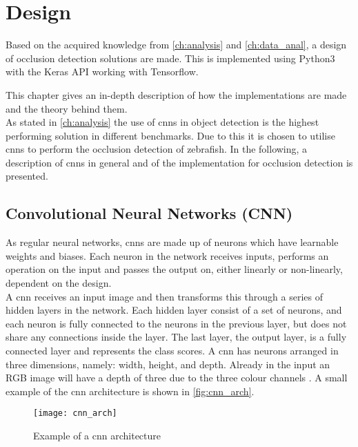\graphicspath{{figures/design/}}
\chapter{Design}\label{ch:design}
Based on the acquired knowledge from \autoref{ch:analysis} and \autoref{ch:data_anal}, a design of occlusion detection solutions are made. This is implemented using Python3 with the Keras API working with Tensorflow.

This chapter gives an in-depth description of how the implementations are made and the theory behind them.\\

As stated in \autoref{ch:analysis} the use of \gls{cnn}s in object detection is the highest performing solution in different benchmarks. Due to this it is chosen to utilise \gls{cnn}s to perform the occlusion detection of zebrafish. In the following, a description of \gls{cnn}s in general and of the implementation for occlusion detection is presented.

\section{Convolutional Neural Networks (CNN)}
As regular neural networks, \gls{cnn}s are made up of neurons which have learnable weights and biases. Each neuron in the network receives inputs, performs an operation on the input and passes the output on, either linearly or non-linearly, dependent on the design.\\

A \gls{cnn} receives an input image and then transforms this through a series of hidden layers in the network. Each hidden layer consist of a set of neurons, and each neuron is fully connected to the neurons in the previous layer, but does not share any connections inside the layer. The last layer, the output layer, is a fully connected layer and represents the class scores. A \gls{cnn} has neurons arranged in three dimensions, namely: width, height, and depth. Already in the input an RGB image will have a depth of three due to the three colour channels \citep{Karpathy2016b}. A small example of the \gls{cnn} architecture is shown in \autoref{fig:cnn_arch}.

\begin{figure}[H]
	\centering
	\texttt{[image: cnn\_arch]}
	\caption{Example of a \gls{cnn} architecture}
	\label{fig:cnn_arch}
\end{figure}

